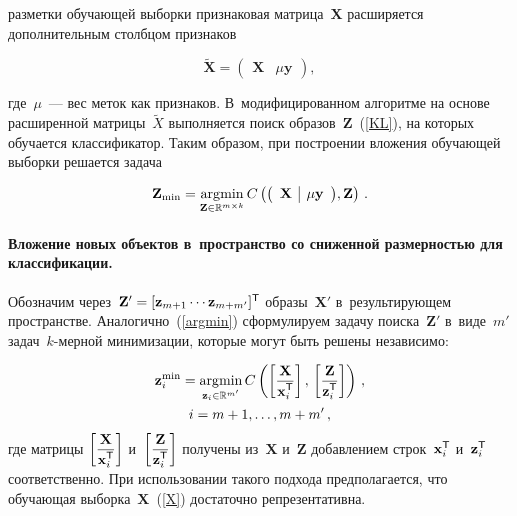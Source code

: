 \begin{multicols}{2}
\pagebreak

\noindent
 разметки обучающей выборки признаковая матрица~$\mathbf{X}$ 
расширяется дополнительным столбцом признаков

\noindent
$$
\tilde{\mathbf X} = \left (
\begin{array}{c|c}
\mathbf X & \mu \mathbf y
\end{array}\right ),
$$

\vspace*{-2pt}

\noindent
где~$\mu$~--- вес меток как признаков.
В~модифицированном алгоритме на основе расширенной матрицы~$\tilde X$ выполняется 
поиск образов~$\mathbf{Z}$~(\ref{KL}), на которых обучается классификатор.
Таким образом, при построении вложения обучающей выборки решается задача

\noindent
$$
\mathbf Z_{\min} = \mathop{\mathrm{arg}\mathrm{min}}\limits_{\mathbf Z \in \mathbb {R}^{m\times k}}
C\left (\mathbf{\left (
\begin{array}{c|c}
\mathbf X & \mu \mathbf y
\end{array}\right )}, \mathbf Z\right )\,.
$$

\vspace*{-12pt}

\paragraph*{Вложение новых объектов в~пространство со сниженной размерностью 
для классификации.}
Обозначим через~$\mathbf{Z}' \hm= [\mathbf z_{m+1}\cdots \mathbf z_{m+m'}]^{\TSF}$ 
образы~$\mathbf{X}'$ в~результирующем пространстве. Аналогично~(\ref{argmin}) 
сформулируем задачу поиска~$\mathbf{Z}'$ в~виде~$m'$ задач~$k$-мер\-ной минимизации, 
которые могут быть решены независимо:

\noindent
\begin{multline*}
\mathbf z_i^{\min} = \mathop{\mathrm{arg}\mathrm{min}}\limits_{\mathbf z_i \in \mathbb {R}^{m'}}C
\left (\left [
\displaystyle\frac{\displaystyle \mathbf X\mathstrut}{\displaystyle \mathbf{x}_i^{{\sf T}} \mathstrut}\right ],\,
\left [ \displaystyle\frac{\displaystyle \mathbf {Z}\mathstrut}{\displaystyle \mathbf {z}_i^{{\sf T}}\mathstrut}\right ]
\right )\,,\\
i = m+1, \ldots, m+m'\,,
\end{multline*}
где матрицы $\left [
\displaystyle\frac{\displaystyle \mathbf X\mathstrut}{\displaystyle \mathbf x_i^{{\sf T}}\mathstrut}\right ]$ и~$\left [ \displaystyle\frac{\displaystyle \mathbf{\mathbf Z}\mathstrut}{\displaystyle \mathbf{z}_i^{{\sf T}} \mathstrut}\right ]$
получены из~$\mathbf{X}$ и~$\mathbf{Z}$ добавлением строк~$\mathbf x_i^{{\sf T}}$ 
и~$\mathbf z_i^{{\sf T}}$ соответственно. При использовании такого подхода предполагается, 
что обучающая выборка~$\mathbf{X}$~(\ref{X}) достаточно репрезентативна.


\end{multicols}
